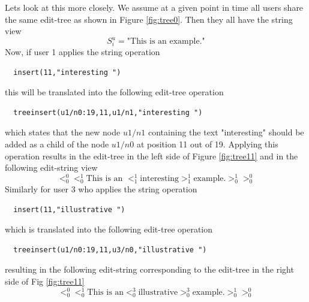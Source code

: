 \documentclass{amsart}
\begin{document}
Lets look at this more closely.
We assume at a given point in time all users share the same edit-tree as shown 
in Figure \ref{fig:tree0}. Then they all have the string view
\[
S^u_i= \text{"This is an example."}
\]
Now, if user 1 applies the string operation
\begin{verbatim}
  insert(11,"interesting ")
\end{verbatim}
this will be translated into the following edit-tree operation
\begin{verbatim}
  treeinsert(u1/n0:19,11,u1/n1,"interesting ")
\end{verbatim}
which states that the new node $u1/n1$ containing the text "interesting"
should be added as a child of the node $u1/n0$ at position 11 out of 19. Applying
this operation results in the edit-tree in the left side of Figure \ref{fig:tree11}
and in the following edit-string view
\[
 <_0^0 <^1_0 
 \text{This is an }<^1_1 
 \text{interesting}
>^1_1  \text{example.} >^1_0 >_0^0
\]
Similarly for user 3 who applies the string operation
\begin{verbatim}
  insert(11,"illustrative ")
\end{verbatim}
which is translated into the following edit-tree operation
\begin{verbatim}
  treeinsert(u1/n0:19,11,u3/n0,"illustrative ")
\end{verbatim}
resulting in the following edit-string corresponding to the edit-tree
in the right side of Fig \ref{fig:tree11}
\[
 <_0^0 <_0^1 
 \text{This is an} <^3_0 
 \text{illustrative}
>^3_0  \text{example.} >_0^1 >_0^0
\]
\end{document}
